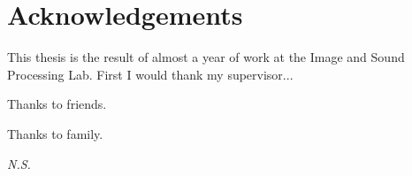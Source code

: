 \chapter{Acknowledgements}
\label{Acknowledgements}
\thispagestyle{empty}

\vspace{0.5cm}
This thesis is the result of almost a year of work at the Image and Sound Processing Lab.
First I would thank my supervisor...

\vspace{0.5cm}
Thanks to friends.

\vspace{0.5cm}
Thanks to family.

\vspace{1cm}
\begin{flushright}
\textit{N.S.}
\end{flushright}
